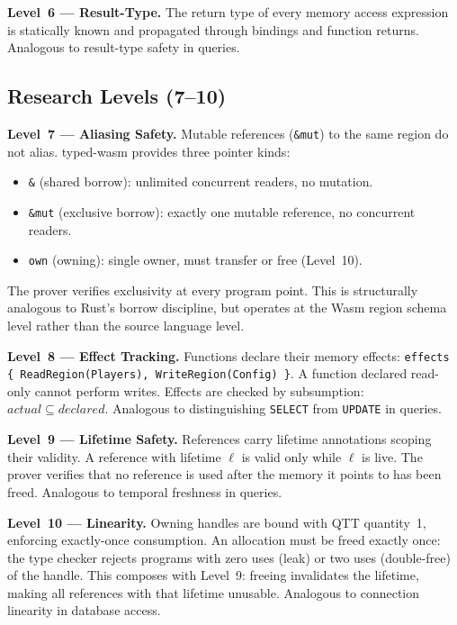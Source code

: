 \documentclass[sigplan,nonacm,screen]{acmart}
\begin{document}
\textbf{Level~6 --- Result-Type.}
The return type of every memory access expression is statically known and
propagated through bindings and function returns. Analogous to result-type
safety in queries.

\subsection{Research Levels (7--10)}

\textbf{Level~7 --- Aliasing Safety.}
Mutable references (\texttt{\&mut}) to the same region do not alias.
typed-wasm provides three pointer kinds:

\begin{itemize}
  \item \texttt{\&} (shared borrow): unlimited concurrent readers, no mutation.
  \item \texttt{\&mut} (exclusive borrow): exactly one mutable reference, no concurrent readers.
  \item \texttt{own} (owning): single owner, must transfer or free (Level~10).
\end{itemize}

The prover verifies exclusivity at every program point. This is
structurally analogous to Rust's borrow discipline, but operates at the
Wasm region schema level rather than the source language level.

\textbf{Level~8 --- Effect Tracking.}
Functions declare their memory effects:
\texttt{effects \{ ReadRegion(Players), WriteRegion(Config) \}}. A function
declared read-only cannot perform writes. Effects are checked by
subsumption: $\mathit{actual} \subseteq \mathit{declared}$. Analogous to
distinguishing \texttt{SELECT} from \texttt{UPDATE} in queries.

\textbf{Level~9 --- Lifetime Safety.}
References carry lifetime annotations scoping their validity. A reference
with lifetime $\ell$ is valid only while $\ell$ is live. The prover
verifies that no reference is used after the memory it points to has been
freed. Analogous to temporal freshness in queries.

\textbf{Level~10 --- Linearity.}
Owning handles are bound with QTT quantity~1, enforcing exactly-once
consumption. An allocation must be freed exactly once: the type checker
rejects programs with zero uses (leak) or two uses (double-free) of the
handle. This composes with Level~9: freeing invalidates the lifetime,
making all references with that lifetime unusable. Analogous to connection
linearity in database access.
\end{document}

